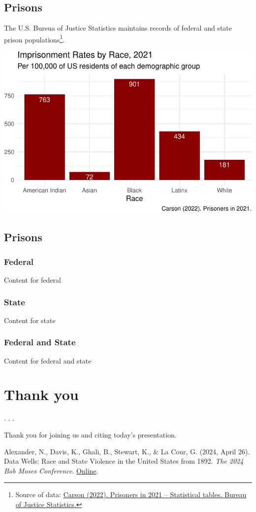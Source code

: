 \documentclass[
  letterpaper,
  DIV=11,
  numbers=noendperiod]{scrartcl}
\begin{document}
\hypertarget{prisons-1}{%
\subsection{Prisons}\label{prisons-1}}

The U.S. Bureua of Justice Statistics maintains records of federal and
state prison populations\footnote{Source of data:
  \href{https://bjs.ojp.gov/library/publications/prisoners-2021-statistical-tables}{Carson
  (2022). Prisoners in 2021 -- Statistical tables. Bureau of Justice
  Statistics.}}.

\includegraphics{2024_04_27_bob_moses_files/figure-pdf/unnamed-chunk-9-1.pdf}

\hypertarget{prisons-2}{%
\subsection{Prisons}\label{prisons-2}}

\subsubsection{Federal}

Content for federal

\subsubsection{State}

Content for state

\subsubsection{Federal and State}

Content for federal and state

\hypertarget{thank-you}{%
\section{Thank you}\label{thank-you}}

. . .

Thank you for joining us and citing today's presentation.

Alexander, N., Davis, K., Ghali, B., Stewart, K., \& La Cour, G. (2024,
April 26). Data Wells: Race and State Violence in the United States from
1892. \emph{The 2024 Bob Moses Conference}.
\href{https://www.bobmosesconference.com/}{Online}.
\end{document}
